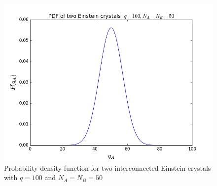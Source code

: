 \documentclass[10pt,a4paper]{amsart}
\begin{document}
\begin{figure}[h]
  \centering
  \includegraphics[width=0.9\linewidth]{figures/EinsteinPDF.png}
  \caption{Probability density function for two interconnected Einstein crystals with $q=100$ and $N_A=N_B=50$}
  \label{fig:EinsteinPDF}
\end{figure}
\end{document}
